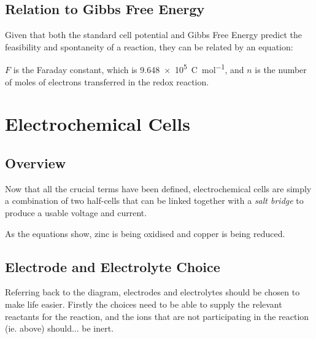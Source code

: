 

		\subsection{Relation to Gibbs Free Energy}

			Given that both the standard cell potential and Gibbs Free Energy predict the feasibility and spontaneity of a reaction, they can
			be related by an equation:



			$F$ is the Faraday constant, which is \SI{9.648e5}{\coulomb\per\mole}, and $n$ is the number of moles of electrons transferred in the
			redox reaction.






	\pagebreak
	\section{Electrochemical Cells}

		\subsection{Overview}

			Now that all the crucial terms have been defined, electrochemical cells are simply a combination of two half-cells that can be
			linked together with a \textit{salt bridge} to produce a usable voltage and current.


			As the equations show, zinc is being oxidised and copper is being reduced.



		\subsection{Electrode and Electrolyte Choice}

			Referring back to the diagram, electrodes and electrolytes should be chosen to make life easier. Firstly the choices need to be
			able to supply the relevant reactants for the reaction, and the ions that are not participating in the reaction (ie.  above)
			should... be inert.

